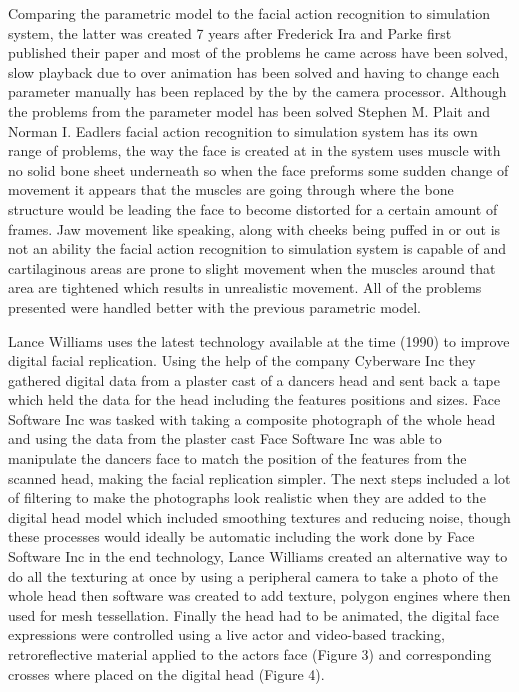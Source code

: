 \documentclass{scrartcl}
\begin{document}
Comparing the parametric model to the facial action recognition to simulation system, the latter was created 7 years after Frederick Ira and Parke first published their paper and most of the problems he came across have been solved, slow playback due to over animation has been solved and having to change each parameter manually has been replaced by the by the camera processor. Although the problems from the parameter model has been solved Stephen M. Plait and Norman I. Eadlers facial action recognition to simulation system has its own range of problems, the way the face is created at in the system uses muscle with no solid bone sheet underneath so when the face preforms some sudden change of movement it appears that the muscles are going through where the bone structure would be leading the face to become distorted for a certain amount of frames. Jaw movement like speaking, along with cheeks being puffed in or out is not an ability the facial action recognition to simulation system is capable of and cartilaginous areas are prone to slight movement when the muscles around that area are tightened which results in unrealistic movement. All of the problems presented were handled better with the previous parametric model.

Lance Williams uses the latest technology available at the time (1990) to improve digital facial replication. Using the help of the company Cyberware Inc they gathered digital data from a plaster cast of a dancers head and sent back a tape which held the data for the head including the features positions and sizes. Face Software Inc was tasked with taking a composite photograph of the whole head and using the data from the plaster cast Face Software Inc was able to manipulate the dancers face to match the position of the features from the scanned head, making the facial replication simpler. The next steps included a lot of filtering to make the photographs look realistic when they are added to the digital head model which included smoothing textures and reducing noise, though these processes would ideally be automatic including the work done by Face Software Inc in the end technology, Lance Williams created an alternative way to do all the texturing at once by using a peripheral camera to take a photo of the whole head then software was created to add texture, polygon engines where then used for mesh tessellation. Finally the head had to be animated, the digital face expressions were controlled using a live actor and video-based tracking, retroreflective material applied to the actors face (Figure 3) and corresponding crosses where placed on the digital head (Figure 4).
\end{document}
